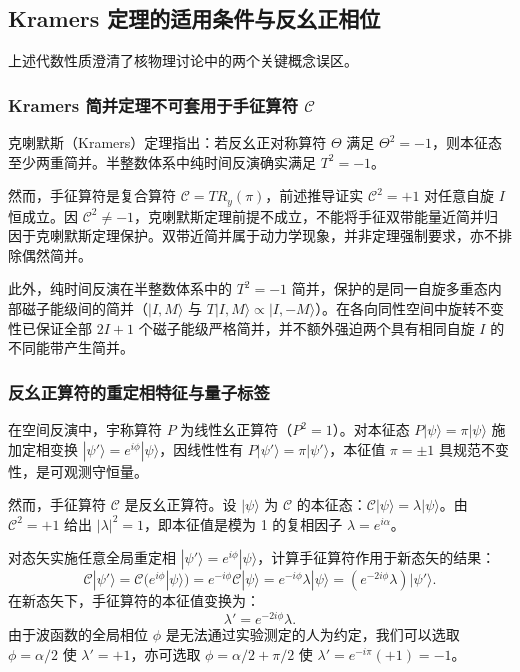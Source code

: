 \subsection{Kramers 定理的适用条件与反幺正相位}\label{sec:3-5-3}

上述代数性质澄清了核物理讨论中的两个关键概念误区。

\subsubsection{Kramers 简并定理不可套用于手征算符 $\mathcal{C}$}\label{sec:3-5-3-1}

克喇默斯（Kramers）定理指出：若反幺正对称算符 $\Theta$ 满足 $\Theta^2 = -1$，则本征态至少两重简并。半整数体系中纯时间反演确实满足 $T^2 = -1$。

然而，手征算符是复合算符 $\mathcal{C} = T R_y(\pi)$，前述推导证实 $\mathcal{C}^2 = +1$ 对任意自旋 $I$ 恒成立。因 $\mathcal{C}^2 \ne -1$，克喇默斯定理前提不成立，不能将手征双带能量近简并归因于克喇默斯定理保护。双带近简并属于动力学现象，并非定理强制要求，亦不排除偶然简并。

此外，纯时间反演在半整数体系中的 $T^2 = -1$ 简并，保护的是同一自旋多重态内部磁子能级间的简并（$|I, M\rangle$ 与 $T|I, M\rangle \propto |I, -M\rangle$）。在各向同性空间中旋转不变性已保证全部 $2I+1$ 个磁子能级严格简并，并不额外强迫两个具有相同自旋 $I$ 的不同能带产生简并。

\subsubsection{反幺正算符的重定相特征与量子标签}\label{sec:3-5-3-2}

在空间反演中，宇称算符 $P$ 为线性幺正算符（$P^2 = 1$）。对本征态 $P|\psi\rangle = \pi |\psi\rangle$ 施加定相变换 $|\psi'\rangle = e^{i\phi}|\psi\rangle$，因线性性有 $P |\psi'\rangle = \pi |\psi'\rangle$，本征值 $\pi = \pm 1$ 具规范不变性，是可观测守恒量。

然而，手征算符 $\mathcal{C}$ 是反幺正算符。设 $|\psi\rangle$ 为 $\mathcal{C}$ 的本征态：$\mathcal{C} |\psi\rangle = \lambda |\psi\rangle$。由 $\mathcal{C}^2 = +1$ 给出 $|\lambda|^2 = 1$，即本征值是模为 1 的复相因子 $\lambda = e^{i\alpha}$。

对态矢实施任意全局重定相 $|\psi'\rangle = e^{i\phi}|\psi\rangle$，计算手征算符作用于新态矢的结果：
\begin{equation}\label{eq:3-5-C-rephase}
\mathcal{C} |\psi'\rangle = \mathcal{C}(e^{i\phi} |\psi\rangle) = e^{-i\phi} \mathcal{C}|\psi\rangle = e^{-i\phi} \lambda |\psi\rangle = \left( e^{-2i\phi} \lambda \right) |\psi'\rangle.
\end{equation}
在新态矢下，手征算符的本征值变换为：
\begin{equation}\label{eq:3-5-lambda-prime}
\lambda' = e^{-2i\phi} \lambda.
\end{equation}
由于波函数的全局相位 $\phi$ 是无法通过实验测定的人为约定，我们可以选取 $\phi = \alpha / 2$ 使 $\lambda' = +1$，亦可选取 $\phi = \alpha / 2 + \pi / 2$ 使 $\lambda' = e^{-i\pi}(+1) = -1$。

